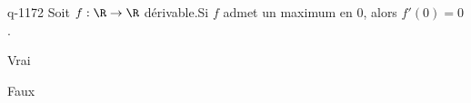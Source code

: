 \begin{truefalse}{q-1172}
Soit $f : \R \to \R$ dérivable.\newline Si $f$ admet un maximum en $0$, alors $f'(0)=0$.
\item* Vrai
\item Faux
\end{truefalse}


